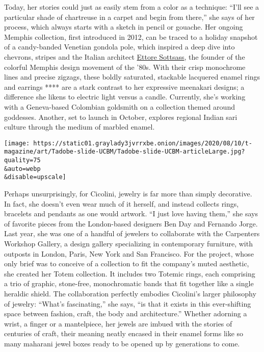 Today, her stories could just as easily stem from a color as a
technique: ``I'll see a particular shade of chartreuse in a carpet and
begin from there,'' she says of her process, which always starts with a
sketch in pencil or gouache. Her ongoing Memphis collection, first
introduced in 2012, can be traced to a holiday snapshot of a
candy-banded Venetian gondola pole, which inspired a deep dive into
chevrons, stripes and the Italian architect
\href{https://www.nytimes3xbfgragh.onion/2017/08/07/t-magazine/ettore-sottsass-designer-memphis-charles-zana.html}{Ettore
Sottsass}, the founder of the colorful Memphis design movement of the
'80s. With their crisp monochrome lines and precise zigzags, these
boldly saturated, stackable lacquered enamel rings and earrings **** are
a stark contrast to her expressive meenakari designs; a difference she
likens to electric light versus a candle. Currently, she's working with
a Geneva-based Colombian goldsmith on a collection themed around
goddesses. Another, set to launch in October, explores regional Indian
sari culture through the medium of marbled enamel.

\texttt{[image: https://static01.graylady3jvrrxbe.onion/images/2020/08/10/t-magazine/art/Tadobe-slide-UCBM/Tadobe-slide-UCBM-articleLarge.jpg?quality=75\\\&auto=webp\\\&disable=upscale]}

Perhaps unsurprisingly, for Cicolini, jewelry is far more than simply
decorative. In fact, she doesn't even wear much of it herself, and
instead collects rings, bracelets and pendants as one would artwork. ``I
just love having them,'' she says of favorite pieces from the
London-based designers Ben Day and Fernando Jorge. Last year, she was
one of a handful of jewelers to collaborate with the Carpenters Workshop
Gallery, a design gallery specializing in contemporary furniture, with
outposts in London, Paris, New York and San Francisco. For the project,
whose only brief was to conceive of a collection to fit the company's
muted aesthetic, she created her Totem collection. It includes two
Totemic rings, each comprising a trio of graphic, stone-free,
monochromatic bands that fit together like a single heraldic shield. The
collaboration perfectly embodies Cicolini's larger philosophy of
jewelry: ``What's fascinating,'' she says, ``is that it exists in this
ever-shifting space between fashion, craft, the body and architecture.''
Whether adorning a wrist, a finger or a mantelpiece, her jewels are
imbued with the stories of centuries of craft, their meaning neatly
encased in their enamel forms like so many maharani jewel boxes ready to
be opened up by generations to come.

